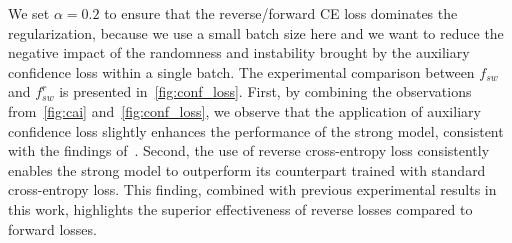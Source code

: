 We set $\alpha=0.2$ to ensure that the reverse/forward CE loss dominates the regularization, because we use a small batch size here and we want to reduce the negative impact of the randomness and instability brought by the auxiliary confidence loss within a single batch.
The experimental comparison between $f_{sw}$ and $f_{sw}^r$ is presented in~\cref{fig:conf_loss}.
First, by combining the observations from~\cref{fig:cai} and~\cref{fig:conf_loss}, we observe that the application of auxiliary confidence loss slightly enhances the performance of the strong model, consistent with the findings of~\citet{burns2023weak}.
Second, the use of reverse cross-entropy loss consistently enables the strong model to outperform its counterpart trained with standard cross-entropy loss. This finding, combined with previous experimental results in this work, highlights the superior effectiveness of reverse losses compared to forward losses.






